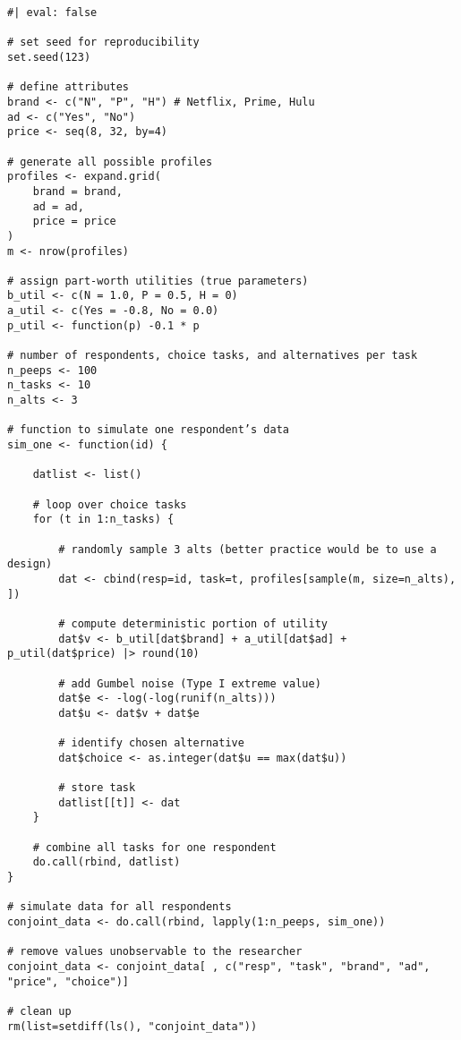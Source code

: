 \documentclass[
  letterpaper,
  DIV=11,
  numbers=noendperiod]{scrartcl}
\begin{document}
\begin{tcolorbox}[enhanced jigsaw, toptitle=1mm, bottomtitle=1mm, left=2mm, rightrule=.15mm, leftrule=.75mm, colbacktitle=quarto-callout-note-color!10!white, opacityback=0, opacitybacktitle=0.6, bottomrule=.15mm, titlerule=0mm, colframe=quarto-callout-note-color-frame, breakable, toprule=.15mm, arc=.35mm, title=\textcolor{quarto-callout-note-color}{\faInfo}\hspace{0.5em}{Note}, coltitle=black, colback=white]

\begin{verbatim}
#| eval: false

# set seed for reproducibility
set.seed(123)

# define attributes
brand <- c("N", "P", "H") # Netflix, Prime, Hulu
ad <- c("Yes", "No")
price <- seq(8, 32, by=4)

# generate all possible profiles
profiles <- expand.grid(
    brand = brand,
    ad = ad,
    price = price
)
m <- nrow(profiles)

# assign part-worth utilities (true parameters)
b_util <- c(N = 1.0, P = 0.5, H = 0)
a_util <- c(Yes = -0.8, No = 0.0)
p_util <- function(p) -0.1 * p

# number of respondents, choice tasks, and alternatives per task
n_peeps <- 100
n_tasks <- 10
n_alts <- 3

# function to simulate one respondent’s data
sim_one <- function(id) {
  
    datlist <- list()
    
    # loop over choice tasks
    for (t in 1:n_tasks) {
        
        # randomly sample 3 alts (better practice would be to use a design)
        dat <- cbind(resp=id, task=t, profiles[sample(m, size=n_alts), ])
        
        # compute deterministic portion of utility
        dat$v <- b_util[dat$brand] + a_util[dat$ad] + p_util(dat$price) |> round(10)
        
        # add Gumbel noise (Type I extreme value)
        dat$e <- -log(-log(runif(n_alts)))
        dat$u <- dat$v + dat$e
        
        # identify chosen alternative
        dat$choice <- as.integer(dat$u == max(dat$u))
        
        # store task
        datlist[[t]] <- dat
    }
    
    # combine all tasks for one respondent
    do.call(rbind, datlist)
}

# simulate data for all respondents
conjoint_data <- do.call(rbind, lapply(1:n_peeps, sim_one))

# remove values unobservable to the researcher
conjoint_data <- conjoint_data[ , c("resp", "task", "brand", "ad", "price", "choice")]

# clean up
rm(list=setdiff(ls(), "conjoint_data"))
\end{verbatim}

\end{tcolorbox}
\end{document}

